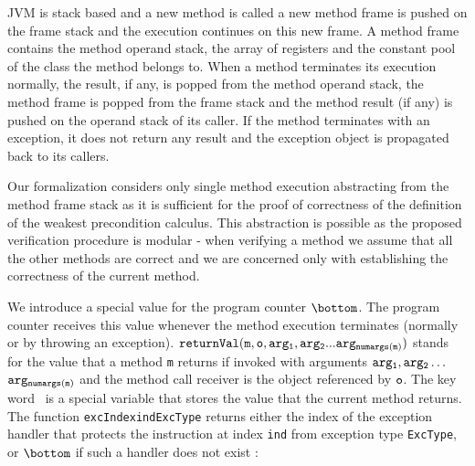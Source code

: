  JVM is stack based and a new method is called a new method frame is pushed on the frame stack and the execution continues on this new frame.
 A method frame contains the method operand stack, the array of registers and the constant pool of the class the method belongs to.
 When a method terminates its execution normally, the result, if any, is popped from the method operand stack, the method frame is
 popped from the frame stack and the method result (if any) is pushed on the operand stack
 of its caller. If the method terminates with an exception, it does not return any result and the exception object is propagated back to its callers.
 
Our formalization considers only single method execution abstracting from the method frame stack as it is sufficient for
 the proof of correctness of the definition of the weakest precondition calculus. This abstraction is possible as the proposed verification procedure is modular - 
when verifying a method we assume that all the other methods are correct and we are concerned
only with establishing the correctness of the current method.


 We introduce a special value for the program counter $\bottom$. The program counter receives this value whenever the method execution 
 terminates (normally or by throwing an
 exception).  $\tt{returnVal( m, o,arg_1, arg_2 ...arg_{numargs(m)}})$ stands for the value that a method \texttt{m} returns if invoked with  arguments
 $\tt{arg_1, arg_2 \ldots}$  $\tt{ arg_{numargs(m)}}$ and the method call receiver is the object referenced by $\tt{o}$. 
The key word \result \ is a special variable that stores the value that the current method returns.  
The function \texttt{excIndex{ind}{ExcType}} returns either the index of the exception handler that protects the instruction at index \texttt{ind} from exception 
type  \texttt{ExcType}, or $\bottom$ if such a handler does not exist :


